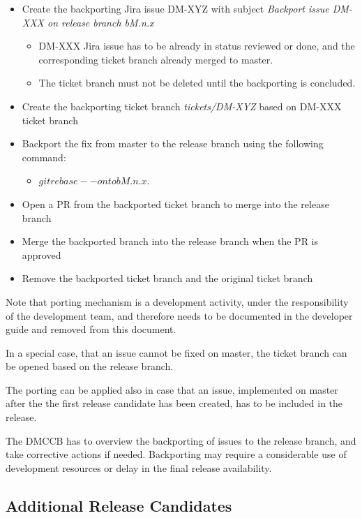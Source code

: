 \begin{itemize}
\item Create the backporting Jira issue DM-XYZ with subject \textit{Backport issue DM-XXX on release branch bM.n.x}
  \begin{itemize}
  \item DM-XXX Jira issue has to be already in status reviewed or done, and the corresponding ticket branch already merged to master. 
  \item The ticket branch must not be deleted  until the backporting is concluded.
  \end{itemize}
\item Create the backporting ticket branch \textit{tickets/DM-XYZ}  based on DM-XXX ticket branch
\item Backport the fix from master to the release branch using the following command: 
  \begin{itemize}
   \item $git rebase --onto bM.n.x$.
  \end{itemize}
\item Open a PR from the backported ticket branch to merge into the release branch
\item Merge the backported branch into the release branch when the PR is approved
\item Remove the backported ticket branch and the original ticket branch
\end{itemize}

Note that porting mechanism is a development activity, under the responsibility of the development team, and therefore needs to be documented in the developer guide and removed from this document.

In a special case, that an issue cannot be fixed on master, the ticket branch can be opened based on the release branch.

The porting can be applied also in case that an issue, implemented on master after the the first release candidate has been created, has to be included in the release.

The DMCCB has to overview the backporting of issues to the release branch, and take corrective actions if needed. Backporting may require a considerable use of development resources or delay in the final release availability.


\subsection{Additional Release Candidates} \label{sec:newrc}

